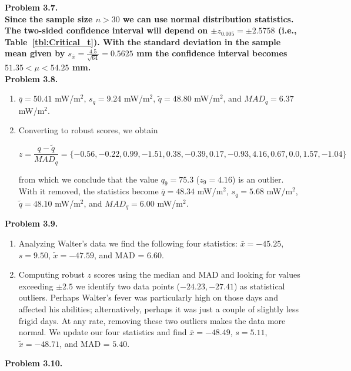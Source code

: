 \noindent
\bf{Problem 3.7.} \\

Since the sample size $n > 30$ we can use normal distribution statistics.  The two-sided confidence
interval will depend on $\pm z_{0.005} = \pm 2.5758$ (i.e., Table~\ref{tbl:Critical_t}).  With the standard deviation in the sample mean given
by $s_{\bar{x}} = \frac{4.5}{\sqrt{64}} = 0.5625$ mm the confidence interval becomes $51.35 < \mu < 54.25$ mm.
\\

\noindent
\bf{Problem 3.8.} \\

\begin{enumerate}[label=\alph*)]
\item $\bar{q} = 50.41$ mW/m$^2$, $s_q = 9.24$ mW/m$^2$, $\tilde{q} = 48.80$ mW/m$^2$,
and $MAD_q = 6.37$ mW/m$^2$.
\item Converting to robust scores, we obtain

\[
z = \frac{q - \tilde{q}}{MAD_q} = \{-0.56, -0.22, 0.99, -1.51, 0.38, -0.39, 0.17, -0.93, 4.16, 0.67, 0.0, 1.57, -1.04\}
\]

from which we conclude that the value $q_9 = 75.3$ ($z_9 = 4.16$) is an outlier.  With it
removed, the statistics become $\bar{q} = 48.34$ mW/m$^2$, $s_q = 5.68$ mW/m$^2$, $\tilde{q} = 48.10$ mW/m$^2$,
and $MAD_q = 6.00$ mW/m$^2$.
\end{enumerate}


\noindent
\bf{Problem 3.9.} \\

\begin{enumerate}[label=\alph*)]
\item Analyzing Walter's data we find the following four statistics: $\bar{x} = -45.25$, $s = 9.50$, $\tilde{x} = -47.59$,
and MAD = $6.60$.
\item Computing robust $z$ scores using the median and MAD and looking for values exceeding $\pm2.5$ we identify two
data points ($-24.23, -27.41$) as statistical outliers.  Perhaps Walter's fever was particularly high on those days and
affected his abilities; alternatively, perhaps it was just a couple of slightly less frigid days.  At any rate, removing these
two outliers makes the data more normal.  We update our four statistics and find
$\bar{x} = -48.49$, $s = 5.11$, $\tilde{x} = -48.71$, and MAD = $5.40$.
\end{enumerate}


\noindent
\bf{Problem 3.10.} \\


